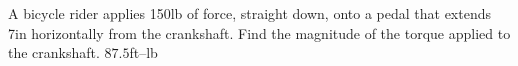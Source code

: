{A bicycle rider applies 150lb of force, straight down, onto a pedal that extends 7in horizontally from the crankshaft. Find the magnitude of the torque applied to the crankshaft.
}
{$87.5$ft--lb
}

